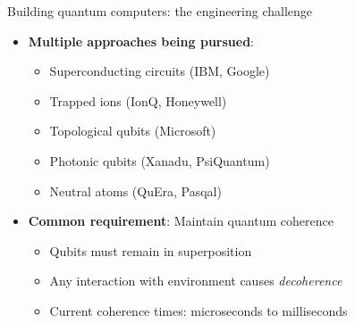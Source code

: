 \documentclass[aspectratio=169, lualatex, handout]{beamer}
\begin{document}
\begin{frame}{Building quantum computers: the engineering challenge}
	\begin{itemize}
		\item \textbf{Multiple approaches being pursued}:
		      \begin{itemize}
			      \item Superconducting circuits (IBM, Google)
			      \item Trapped ions (IonQ, Honeywell)
			      \item Topological qubits (Microsoft)
			      \item Photonic qubits (Xanadu, PsiQuantum)
			      \item Neutral atoms (QuEra, Pasqal)
		      \end{itemize}
		\item \textbf{Common requirement}: Maintain quantum coherence
		      \begin{itemize}
			      \item Qubits must remain in superposition
			      \item Any interaction with environment causes \textit{decoherence}
			      \item Current coherence times: microseconds to milliseconds
		      \end{itemize}
	\end{itemize}
\end{frame}
\end{document}

